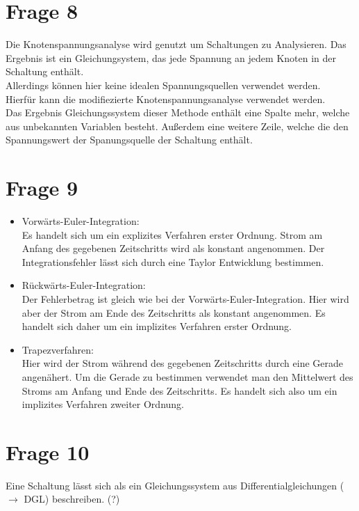 \documentclass[a4paper]{scrartcl}
\begin{document}
\section*{Frage 8}
Die Knotenspannungsanalyse wird genutzt um Schaltungen zu Analysieren. Das Ergebnis ist ein Gleichungsystem, das jede Spannung an jedem Knoten in der Schaltung enthält.\\
Allerdings können hier keine idealen Spannungsquellen verwendet werden.\\
Hierfür kann die modifiezierte Knotenspannungsanalyse verwendet werden.\\
Das Ergebnis Gleichungssystem dieser Methode enthält eine Spalte mehr, welche aus unbekannten Variablen besteht. Außerdem eine weitere Zeile, welche die den Spannungswert der Spanungsquelle der Schaltung enthält.



\section*{Frage 9}
\begin{itemize}
	\item Vorwärts-Euler-Integration: \\
	Es handelt sich um ein explizites Verfahren erster Ordnung. Strom am Anfang des gegebenen Zeitschritts wird als konstant angenommen. Der Integrationsfehler lässt sich durch eine Taylor Entwicklung bestimmen.
	 
	\item Rückwärts-Euler-Integration: \\
	Der Fehlerbetrag ist gleich wie bei der Vorwärts-Euler-Integration. Hier wird aber der Strom am Ende des Zeitschritts als konstant angenommen. Es handelt sich daher um ein implizites Verfahren erster Ordnung.
	
	\item Trapezverfahren:\\
	Hier wird der Strom während des gegebenen Zeitschritts durch eine Gerade angenähert. Um die Gerade zu bestimmen verwendet man den Mittelwert des Stroms am Anfang und Ende des Zeitschritts. Es handelt sich also um ein implizites Verfahren zweiter Ordnung.
		
\end{itemize}



\section*{Frage 10}
Eine Schaltung lässt sich als ein Gleichungssystem aus Differentialgleichungen ($\rightarrow$ DGL) beschreiben. (?)
\end{document}
